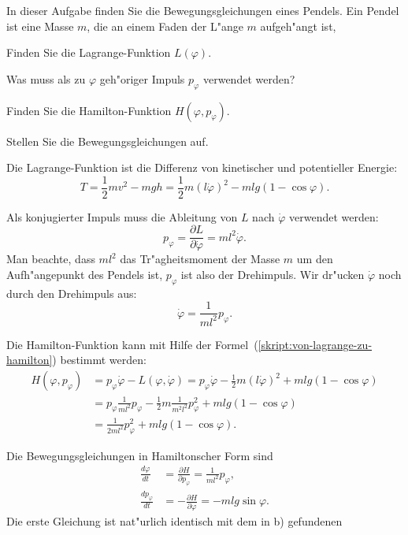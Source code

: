 In dieser Aufgabe finden Sie die Bewegungsgleichungen eines Pendels.
Ein Pendel ist eine Masse $m$, die an einem Faden der L"ange $m$ 
aufgeh"angt ist, 

\begin{teilaufgaben}
\item Finden Sie die Lagrange-Funktion $L(\varphi)$.
\item Was muss als zu $\varphi$ geh"origer Impuls $p_\varphi$ verwendet werden?
\item Finden Sie die Hamilton-Funktion $H(\varphi, p_\varphi)$.
\item Stellen Sie die Bewegungsgleichungen auf.
\end{teilaufgaben}

\begin{loesung}
\begin{teilaufgaben}
\item Die Lagrange-Funktion ist die Differenz von kinetischer und
potentieller Energie:
\[
T
=
\frac12mv^2-mgh
=
\frac12m(l\dot\varphi)^2-mlg(1-\cos\varphi).
\]
\item
Als konjugierter Impuls muss die Ableitung von $L$ nach $\dot\varphi$
verwendet werden:
\[
p_\varphi
=
\frac{\partial L}{\partial\dot\varphi}
=
ml^2\dot\varphi.
\]
Man beachte, dass $ml^2$ das Tr"agheitsmoment der Masse $m$ um den
Aufh"angepunkt des Pendels ist, $p_\varphi$ ist also der Drehimpuls.
Wir dr"ucken $\dot\varphi$ noch durch den Drehimpuls aus:
\[
\dot\varphi
=
\frac{1}{ml^2}p_{\varphi}.
\]
\item
Die Hamilton-Funktion kann mit Hilfe der
Formel~(\ref{skript:von-lagrange-zu-hamilton})
bestimmt werden:
\begin{align*}
H(\varphi,p_\varphi)
&=
p_\varphi\dot\varphi-L(\varphi,\dot\varphi)
=
p_\varphi\dot\varphi - \frac12 m(l\dot\varphi)^2+mlg(1-\cos\varphi)
\\
&=
p_\varphi\frac{1}{ml^2}p_\varphi-\frac12m\frac{1}{m^2l^2}p_\varphi^2
+mlg(1-\cos\varphi)
\\
&=
\frac1{2ml^2}p_\varphi^2 + mlg(1-\cos\varphi).
\end{align*}
\item
Die Bewegungsgleichungen in Hamiltonscher Form sind
\begin{align*}
\frac{d\varphi}{dt}
&=
\frac{\partial H}{\partial p_\varphi}
=
\frac{1}{ml^2}p_\varphi,
\\
\frac{dp_\varphi}{dt}
&=
-\frac{\partial H}{\partial\varphi}
=
-mlg\sin\varphi.
\end{align*}
Die erste Gleichung ist nat"urlich identisch mit dem in b) gefundenen

\end{teilaufgaben}
\end{loesung}
